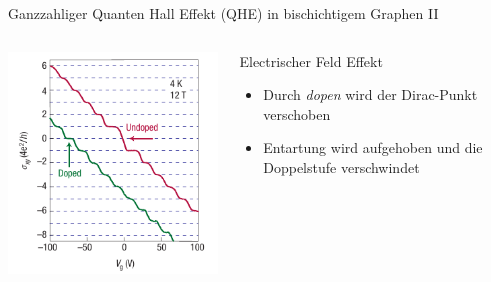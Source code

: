 \documentclass[../defence.tex]{subfiles}
\begin{document}
  \begin{frame}{Ganzzahliger Quanten Hall Effekt (QHE) in bischichtigem Graphen II}
    \begin{columns}[onlytextwidth, T]
        \includegraphics[width=\linewidth]{images/bilayer_qhe.pdf}
        \cite{geim2007}
        \begin{block}{Electrischer Feld Effekt}
          \begin{itemize}
            \item Durch \textit{dopen} wird der Dirac-Punkt verschoben
            \item Entartung wird aufgehoben und die Doppelstufe verschwindet
          \end{itemize}
        \end{block}
    \end{columns}
  \end{frame}
\end{document}
